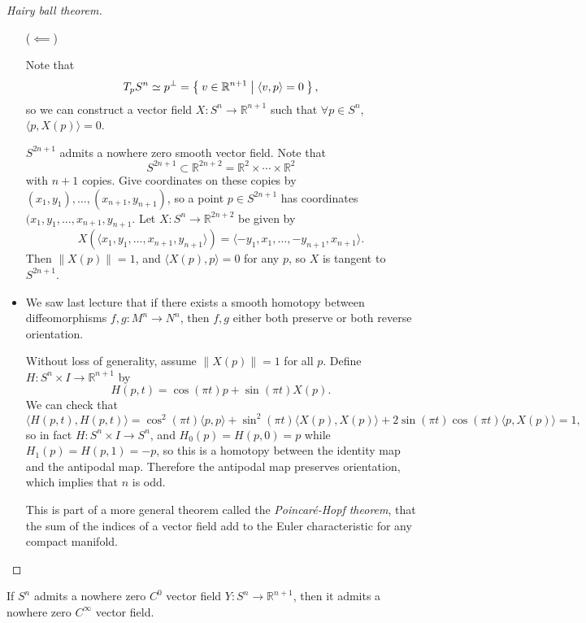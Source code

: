 \begin{proof}[Hairy ball theorem]
\begin{itemize}
  \item[($\impliedby$)]{

    Note that
    $$
           T_p S^n
    \simeq p^\perp
    =      \Set{ v \in \mathbb{R}^{n+1}  | \langle v, p \rangle = 0 },
    $$
    so we can construct a vector field $X: S^n \to \mathbb{R}^{n+1}$
    such that $\forall p \in S^n$, $\langle p, X(p) \rangle = 0$.

    $S^{2n+1}$ admits a nowhere zero smooth vector field. Note that
    $$
            S^{2n + 1}
    \subset \mathbb{R}^{2n + 2}
    = \mathbb{R}^2 \times \cdots \times \mathbb{R}^2
    $$
    with $n + 1$ copies. Give coordinates on these
    copies by $(x_1, y_1), \dots, (x_{n+1}, y_{n+1})$, so a point
    $p \in S^{2n + 1}$ has coordinates
    $(x_1, y_1, \dots, x_{n+1}, y_{n+1}$. Let
    $X: S^n \to \mathbb{R}^{2n + 2}$
    be given by
    $$
      X(\langle x_1, y_1, \dots, x_{n+1}, y_{n+1}\rangle)
    = \langle -y_1, x_1, \dots, -y_{n+1}, x_{n+1} \rangle.
    $$
    Then $\| X(p) \| = 1$, and $\langle X(p), p \rangle = 0$ for any $p$,
    so $X$ is tangent to $S^{2n + 1}$.
  }
  \item{
    We saw last lecture that if there exists a smooth homotopy between
    diffeomorphisms $f, g: M^n \to N^n$, then $f, g$ either both
    preserve or both reverse orientation.

    Without loss of generality, assume $\| X(p) \| = 1$ for all $p$.
    Define $H: S^n \times I \to \mathbb{R}^{n+1}$ by
    $$
      H(p, t)
    = \cos(\pi t)p + \sin(\pi t) X(p).
    $$
    We can check that
    $$
      \langle H(p,t), H(p,t) \rangle
    = \cos^2 (\pi t) \langle p, p \rangle
    + \sin^2 (\pi t) \langle X(p), X(p) \rangle
    + 2 \sin (\pi t) \cos (\pi t) \langle p, X(p) \rangle
    = 1,
    $$
    so in fact $H : S^n \times I \to S^n$, and
    $H_0(p) = H(p, 0) = p$ while $H_1(p) = H(p, 1) = -p$, so this is a
    homotopy between the identity map and the antipodal map. Therefore
    the antipodal map preserves orientation, which implies that $n$ is
    odd.

    This is part of a more general theorem called the
    \emph{Poincar\'e-Hopf theorem}, that the sum of the indices of a
    vector field add to the Euler characteristic for any compact manifold.
  }
\end{itemize}
\end{proof}

\begin{prop}
If $S^n$ admits a nowhere zero $C^0$ vector field $Y: S^n \to
\mathbb{R}^{n+1}$, then it admits a nowhere zero $C^\infty$ vector
field.
\end{prop}

